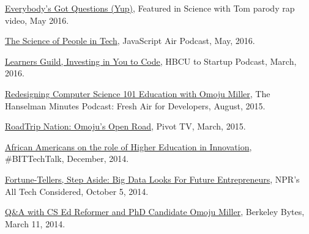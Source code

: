 \documentclass[11pt,article,oneside]{memoir}
\begin{document}
\ind \href{https://www.youtube.com/watch?v=q5mmE05e82I&ab_channel=ScienceWithTom}{Everybody's Got Questions (Yup)}, Featured in Science with Tom parody rap video, May 2016.

\ind \href{http://audio.javascriptair.com/e/022-jsair-the-science-of-people-in-tech-with-kate-edwards-omoju-miller-and-steve-andrews/}{The Science of People in Tech}, JavaScript Air Podcast, May, 2016.

\ind \href{https://www.youtube.com/watch?v=T0wQRr4RuqM&ab_channel=HBCUtoStartup}{Learners Guild, Investing in You to Code,} HBCU to Startup Podcast, March, 2016.

\ind \href{http://hanselminutes.com/488/redesigning-computer-science-101-education-with-omoju-miller}{Redesigning Computer Science 101 Education with Omoju Miller}, The Hanselman Minutes Podcast: Fresh Air for Developers, August, 2015.

\ind \href{http://roadtripnation.com/leader/omoju-miller}{RoadTrip Nation: Omoju's Open Road}, Pivot TV, March, 2015.

\ind \href{https://www.blacksintechnology.net/the-road-to-50-podcast-african-americans-on-the-role-of-higher-education-in-innovation/}{African Americans on the role of Higher Education in Innovation}, \#BITTechTalk, December, 2014.

\ind \href{http://www.npr.org/sections/alltechconsidered/2014/10/05/351851015/fortune-tellers-step-aside-big-data-looks-for-future-entrepreneurs}{Fortune-Tellers, Step Aside: Big Data Looks For Future Entrepreneurs}, NPR's  All Tech Considered, October 5, 2014.

\ind \href{http://best.berkeley.edu/2015/03/11/best-labber-in-berkeley-byte-qa-with-cs-ed-reformer-and-phd-candidate-omoju-miller/}{Q\&A with CS Ed Reformer and PhD Candidate Omoju Miller}, Berkeley Bytes, March 11, 2014.
\end{document}

